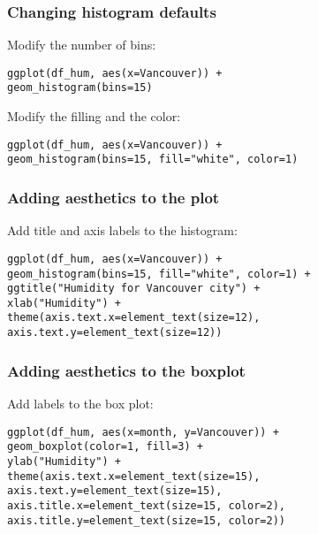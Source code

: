 \documentclass{beamer}
\begin{document}
	\begin{frame}[fragile]
		\frametitle{Changing histogram defaults}

		Modify the number of bins:

		\vspace{2em}

		\begin{exampleblock}{}
		\begin{BVerbatim}
ggplot(df_hum, aes(x=Vancouver)) + 
geom_histogram(bins=15)
		\end{BVerbatim}
		\end{exampleblock}{}

		\vspace{2em}

		Modify the filling and the color:

		\vspace{2em}

		\begin{exampleblock}{}
		\begin{BVerbatim}
ggplot(df_hum, aes(x=Vancouver)) + 
geom_histogram(bins=15, fill="white", color=1)
		\end{BVerbatim}
		\end{exampleblock}{}
	\end{frame}

	\begin{frame}[fragile]
		\frametitle{Adding aesthetics to the plot}

		Add title and axis labels to the histogram:

		\vspace{2em}

		\begin{exampleblock}{}
		\begin{BVerbatim}
ggplot(df_hum, aes(x=Vancouver)) + 
geom_histogram(bins=15, fill="white", color=1) +
ggtitle("Humidity for Vancouver city") +
xlab("Humidity") +
theme(axis.text.x=element_text(size=12),
axis.text.y=element_text(size=12))
		\end{BVerbatim}
		\end{exampleblock}{}
		
	\end{frame}

	\begin{frame}[fragile]
		\frametitle{Adding aesthetics to the boxplot}

		Add labels to the box plot:

		\vspace{2em}

		\begin{exampleblock}{}
		\begin{BVerbatim}
ggplot(df_hum, aes(x=month, y=Vancouver)) + 
geom_boxplot(color=1, fill=3) + 
ylab("Humidity") + 
theme(axis.text.x=element_text(size=15),
axis.text.y=element_text(size=15),
axis.title.x=element_text(size=15, color=2),
axis.title.y=element_text(size=15, color=2))
		\end{BVerbatim}
		\end{exampleblock}{}
		
	\end{frame}
\end{document}
